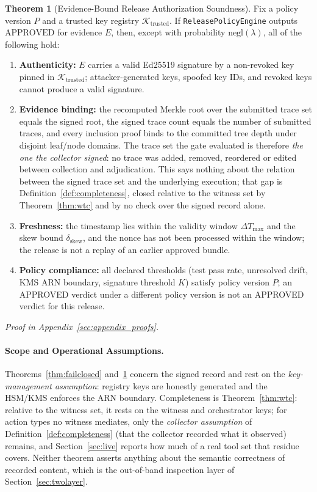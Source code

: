 \documentclass[letterpaper,10pt,twocolumn]{article}
\theoremstyle{definition}
\newtheorem{theorem}{Theorem}
\begin{document}
\begin{theorem}[Evidence-Bound Release Authorization Soundness]\label{thm:authorization}
Fix a policy version $P$ and a trusted key registry $\mathcal{K}_{\text{trusted}}$. If \textnormal{\texttt{ReleasePolicyEngine}} outputs $\text{APPROVED}$ for evidence $E$, then, except with probability $\text{negl}(\lambda)$, all of the following hold:
\begin{enumerate}
    \item[(i)] \textbf{Authenticity:} $E$ carries a valid Ed25519 signature by a non-revoked key pinned in $\mathcal{K}_{\text{trusted}}$; attacker-generated keys, spoofed key IDs, and revoked keys cannot produce a valid signature.
    \item[(ii)] \textbf{Evidence binding:} the recomputed Merkle root over the submitted trace set equals the signed root, the signed trace count equals the number of submitted traces, and every inclusion proof binds to the committed tree depth under disjoint leaf/node domains. The trace set the gate evaluated is therefore \emph{the one the collector signed}: no trace was added, removed, reordered or edited between collection and adjudication. This says nothing about the relation between the signed trace set and the underlying execution; that gap is Definition~\ref{def:completeness}, closed relative to the witness set by Theorem~\ref{thm:wtc} and by no check over the signed record alone.
    \item[(iii)] \textbf{Freshness:} the timestamp lies within the validity window $\Delta T_{\text{max}}$ and the skew bound $\delta_{\text{skew}}$, and the nonce has not been processed within the window; the release is not a replay of an earlier approved bundle.
    \item[(iv)] \textbf{Policy compliance:} all declared thresholds (test pass rate, unresolved drift, KMS ARN boundary, signature threshold $K$) satisfy policy version $P$; an APPROVED verdict under a different policy version is not an APPROVED verdict for this release.
\end{enumerate}
\end{theorem}

\noindent\emph{Proof in Appendix~\ref{sec:appendix_proofs}.}

\paragraph{Scope and Operational Assumptions.}
Theorems~\ref{thm:failclosed} and~\ref{thm:authorization} concern the signed record and rest on the \emph{key-management assumption}: registry keys are honestly generated and the HSM/KMS enforces the ARN boundary. Completeness is Theorem~\ref{thm:wtc}: relative to the witness set, it rests on the witness and orchestrator keys; for action types no witness mediates, only the \emph{collector assumption} of Definition~\ref{def:completeness} (that the collector recorded what it observed) remains, and Section~\ref{sec:live} reports how much of a real tool set that residue covers. Neither theorem asserts anything about the semantic correctness of recorded content, which is the out-of-band inspection layer of Section~\ref{sec:twolayer}.
\end{document}
